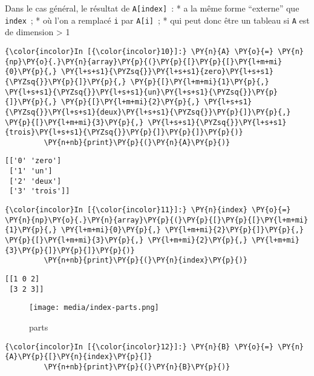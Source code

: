     Dans le cas général, le résultat de \texttt{A{[}index{]}}~: * a la même
forme ``externe'' que \texttt{index}~; * où l'on a remplacé \texttt{i}
par \texttt{A{[}i{]}}~; * qui peut donc être un tableau si \texttt{A}
est de dimension \textgreater{} 1

    \begin{Verbatim}[commandchars=\\\{\}]
{\color{incolor}In [{\color{incolor}10}]:} \PY{n}{A} \PY{o}{=} \PY{n}{np}\PY{o}{.}\PY{n}{array}\PY{p}{(}\PY{p}{[}\PY{p}{[}\PY{l+m+mi}{0}\PY{p}{,} \PY{l+s+s1}{\PYZsq{}}\PY{l+s+s1}{zero}\PY{l+s+s1}{\PYZsq{}}\PY{p}{]}\PY{p}{,} \PY{p}{[}\PY{l+m+mi}{1}\PY{p}{,} \PY{l+s+s1}{\PYZsq{}}\PY{l+s+s1}{un}\PY{l+s+s1}{\PYZsq{}}\PY{p}{]}\PY{p}{,} \PY{p}{[}\PY{l+m+mi}{2}\PY{p}{,} \PY{l+s+s1}{\PYZsq{}}\PY{l+s+s1}{deux}\PY{l+s+s1}{\PYZsq{}}\PY{p}{]}\PY{p}{,} \PY{p}{[}\PY{l+m+mi}{3}\PY{p}{,} \PY{l+s+s1}{\PYZsq{}}\PY{l+s+s1}{trois}\PY{l+s+s1}{\PYZsq{}}\PY{p}{]}\PY{p}{]}\PY{p}{)}
         \PY{n+nb}{print}\PY{p}{(}\PY{n}{A}\PY{p}{)}
\end{Verbatim}


    \begin{Verbatim}[commandchars=\\\{\}]
[['0' 'zero']
 ['1' 'un']
 ['2' 'deux']
 ['3' 'trois']]

    \end{Verbatim}

    \begin{Verbatim}[commandchars=\\\{\}]
{\color{incolor}In [{\color{incolor}11}]:} \PY{n}{index} \PY{o}{=} \PY{n}{np}\PY{o}{.}\PY{n}{array}\PY{p}{(}\PY{p}{[}\PY{p}{[}\PY{l+m+mi}{1}\PY{p}{,} \PY{l+m+mi}{0}\PY{p}{,} \PY{l+m+mi}{2}\PY{p}{]}\PY{p}{,} \PY{p}{[}\PY{l+m+mi}{3}\PY{p}{,} \PY{l+m+mi}{2}\PY{p}{,} \PY{l+m+mi}{3}\PY{p}{]}\PY{p}{]}\PY{p}{)}
         \PY{n+nb}{print}\PY{p}{(}\PY{n}{index}\PY{p}{)}
\end{Verbatim}


    \begin{Verbatim}[commandchars=\\\{\}]
[[1 0 2]
 [3 2 3]]

    \end{Verbatim}

    \begin{figure}
\centering
\texttt{[image: media/index-parts.png]}
\caption{parts}
\end{figure}

    \begin{Verbatim}[commandchars=\\\{\}]
{\color{incolor}In [{\color{incolor}12}]:} \PY{n}{B} \PY{o}{=} \PY{n}{A}\PY{p}{[}\PY{n}{index}\PY{p}{]}
         \PY{n+nb}{print}\PY{p}{(}\PY{n}{B}\PY{p}{)}
\end{Verbatim}


